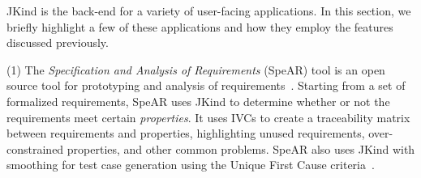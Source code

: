 \documentclass{llncs}
\newcommand{\jkind}{{\sc JKind}\xspace}
\newcommand{\jkindapi}{{\sc JKindApi}\xspace}
\newcommand{\lustre}{{\sc Lustre}\xspace}
\newcommand{\spear}{{\sc SpeAR}\xspace}
\begin{document}
\jkind is the back-end for a variety of user-facing applications. In this section, we briefly highlight a few of these applications and how they employ the features discussed previously.
%
%

(1) The {\em Specification and Analysis of Requirements} (\spear) tool is an open source tool for prototyping and analysis of requirements~\cite{fifarek2017nfm}.  Starting from a set of formalized requirements, \spear uses \jkind to determine whether or not the requirements meet certain {\em properties}.  It uses IVCs to create a traceability matrix between requirements and properties, highlighting unused requirements, over-constrained properties, and other common problems. \spear also uses \jkind with smoothing for test case generation using the Unique First Cause criteria~\cite{whalen2006issta}.
%
%
\end{document}
